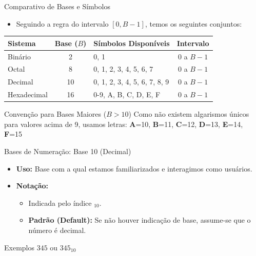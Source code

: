 \begin{frame}{Comparativo de Bases e Símbolos}
    \begin{itemize}
        \item Seguindo a regra do intervalo $[0, B-1]$, temos os seguintes conjuntos:
    \end{itemize}

    \begin{table}[]
        \centering
        \begin{tabular}{|l|c|l|c|}
            \hline
            \textbf{Sistema} & \textbf{Base ($B$)} & \textbf{Símbolos Disponíveis} & \textbf{Intervalo} \\ \hline
            Binário          & 2                   & 0, 1                          & $0$ a $B-1$        \\ \hline
            Octal            & 8                   & 0, 1, 2, 3, 4, 5, 6, 7        & $0$ a $B-1$        \\ \hline
            Decimal          & 10                  & 0, 1, 2, 3, 4, 5, 6, 7, 8, 9  & $0$ a $B-1$        \\ \hline
            Hexadecimal      & 16                  & 0-9, A, B, C, D, E, F         & $0$ a $B-1$        \\ \hline
        \end{tabular}
    \end{table}

    \begin{block}{Convenção para Bases Maiores ($B > 10$)}
        Como não existem algarismos únicos para valores acima de 9, usamos letras:
        \centering
        \textbf{A}=10, \textbf{B}=11, \textbf{C}=12, \textbf{D}=13, \textbf{E}=14, \textbf{F}=15
    \end{block}
\end{frame}

\begin{frame}{Bases de Numeração: Base 10 (Decimal)}
    \begin{itemize}
        \item \textbf{Uso:} Base com a qual estamos familiarizados e interagimos como usuários.
        \item \textbf{Notação:}
              \begin{itemize}
                  \item Indicada pelo índice $_{10}$.
                  \item \textbf{Padrão (Default):} Se não houver indicação de base, assume-se que o número é decimal.
              \end{itemize}
    \end{itemize}

    \begin{exampleblock}{Exemplos}
        \centering
        $345$ \quad ou \quad $345_{10}$
    \end{exampleblock}
\end{frame}

